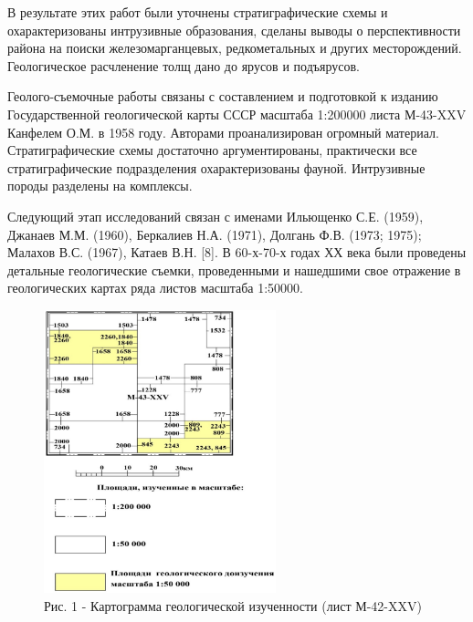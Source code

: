 \begin{multicols}{2}
В результате этих работ были уточнены стратиграфические схемы и
охарактеризованы интрузивные образования, сделаны выводы о
перспективности района на поиски железомарганцевых, редкометальных и
других месторождений. Геологическое расчленение толщ дано до ярусов и
подъярусов.

Геолого-съемочные работы связаны с составлением и подготовкой к изданию
Государственной геологической карты СССР масштаба 1:200000 листа
М-43-XXV Канфелем О.М. в 1958 году. Авторами проанализирован огромный
материал. Стратиграфические схемы достаточно аргументированы,
практически все стратиграфические подразделения охарактеризованы фауной.
Интрузивные породы разделены на комплексы.

Следующий этап исследований связан с именами Ильющенко С.Е. (1959),
Джанаев М.М. (1960), Беркалиев Н.А. (1971), Долгань Ф.В. (1973; 1975);
Малахов В.С. (1967), Катаев В.Н. {[}8{]}. В 60-х-70-х годах ХХ века были
проведены детальные геологические съемки, проведенными и нашедшими свое
отражение в геологических картах ряда листов масштаба 1:50000.
\end{multicols}

\begin{figure}[H]
	\centering
	\includegraphics[width=0.6\textwidth]{media/gorn2/image16}
	\caption*{Рис. 1 - Картограмма геологической изученности (лист М-42-XXV)}
\end{figure}

